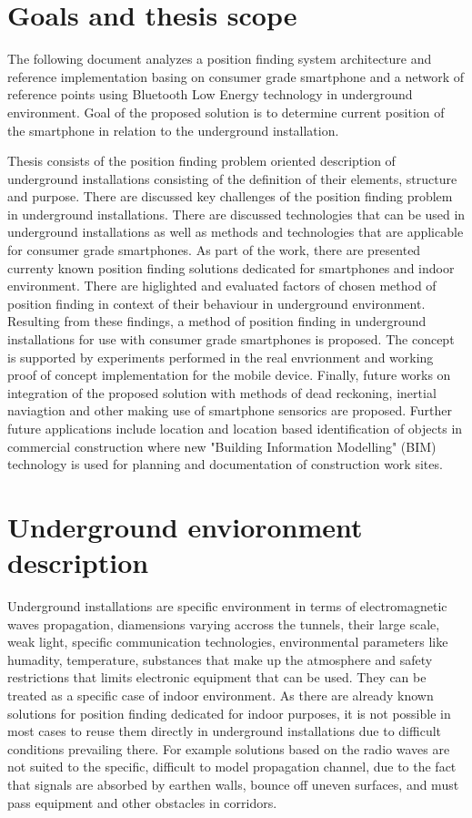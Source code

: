 \documentclass[../main.tex]{subfiles}
\begin{document}
\chapter{Goals and thesis scope}

The following document analyzes a position finding system architecture and reference implementation basing on consumer grade smartphone and a network of reference points using Bluetooth Low Energy technology in underground environment. Goal of the proposed solution is to determine current position of the smartphone in relation to the underground installation.

Thesis consists of the position finding problem oriented description of underground installations consisting of the definition of their elements, structure and purpose. There are discussed key challenges of the position finding problem in underground installations. There are discussed technologies that can be used in underground installations as well as methods and technologies that are applicable for consumer grade smartphones. As part of the work, there are presented currenty known position finding solutions dedicated for smartphones and indoor environment. There are higlighted and evaluated factors of chosen method of position finding in context of their behaviour in underground environment. Resulting from these findings, a method of position finding in underground installations for use with consumer grade smartphones is proposed. The concept is supported by experiments performed in the real envrionment and working proof of concept implementation for the mobile device. Finally, future works on integration of the proposed solution with methods of dead reckoning, inertial naviagtion and other making use of smartphone sensorics are proposed. Further future applications include location and location based identification of objects in commercial construction where new "Building Information Modelling" (BIM) technology is used for planning and documentation of construction work sites.

\chapter{Underground envioronment description}

Underground installations are specific environment in terms of electromagnetic waves propagation, diamensions varying accross the tunnels, their large scale, weak light, specific communication technologies, environmental parameters like humadity, temperature, substances that make up the atmosphere and safety restrictions that limits electronic equipment that can be used. They can be treated as a specific case of indoor environment. As there are already known solutions for position finding dedicated for indoor purposes, it is not possible in most cases to reuse them directly in underground installations due to difficult conditions prevailing there. For example solutions based on the radio waves are not suited to the specific, difficult to model propagation channel, due to the fact that signals are absorbed by earthen walls, bounce off uneven surfaces, and must pass equipment and other obstacles in corridors.
\end{document}
